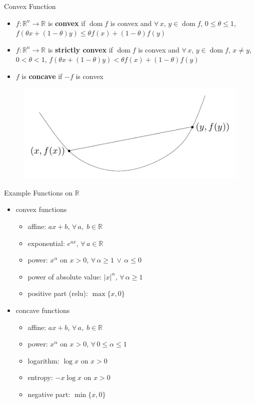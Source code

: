 \documentclass[10pt,handout]{beamer}
\newcommand{\ds}{\displaystyle}
\DeclareMathOperator*{\dom}{dom}
\theoremstyle{definition}
\begin{document}
\begin{frame}{Convex Function}
  \begin{itemize}
    \item $f:\mathbb{R}^n\to\mathbb{R}$ is {\bf convex} if $\dom f$ is convex and $\forall\,x,\,y\in\dom f$, $0\leqslant\theta\leqslant 1$, $\ds f(\theta x + (1 - \theta)y)\leqslant\theta f(x) + (1 - \theta) f(y)$
    \item $f:\mathbb{R}^n\to\mathbb{R}$ is {\bf strictly convex} if $\dom f$ is convex and $\forall\,x,\,y\in\dom f$, $x\ne y$, $0 < \theta < 1$, $\ds f(\theta x + (1 - \theta)y) < \theta f(x) + (1 - \theta) f(y)$
    \item $f$ is {\bf concave} if $-f$ is convex
  \end{itemize}
  \begin{figure}[!htbp]
    \centering
    \includegraphics[scale=1,page=1]{fig/note06/03.pdf}
  \end{figure}
\end{frame}

\begin{frame}{Example Functions on $\mathbb{R}$}
  \begin{itemize}
    \item convex functions
      \begin{itemize}
        \item affine: $\ds ax + b$, $\forall\,a,\;b\in\mathbb{R}$
        \item exponential: $\ds e^{a x}$, $\forall\,a\in\mathbb{R}$
        \item power: $\ds x^\alpha$ on $x > 0$, $\forall\,\alpha\geqslant 1\,\vee\,\alpha\leqslant 0$
        \item power of absolute value: $\ds |x|^\alpha$, $\forall\,\alpha\geqslant 1$
        \item positive part (relu): $\max\{x, 0\}$
      \end{itemize}
    \item concave functions
      \begin{itemize}
        \item affine: $\ds ax + b$, $\forall\,a,\;b\in\mathbb{R}$
        \item power: $\ds x^\alpha$ on $x > 0$, $\forall\,0\leqslant\alpha\leqslant 1$
        \item logarithm: $\ds\log x$ on $x > 0$
        \item entropy: $\ds -x\log x$ on $x > 0$ 
        \item negative part: $\min\{x, 0\}$
      \end{itemize}
  \end{itemize}
\end{frame}
\end{document}
